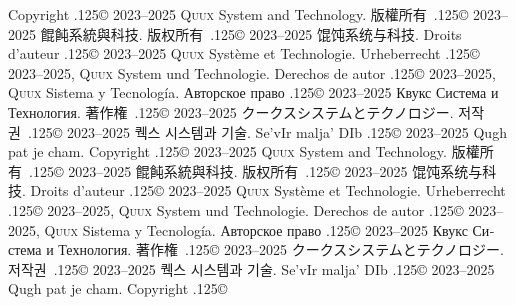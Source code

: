 \documentclass{cookbook}
\begin{document}
\enlargethispage{9.956575mm}%
\footnotesize%
\singlespacing%
\setlength{\parindent}{0pt}%
\setlength{\parskip}{.5\baselineskip}%
\setlength{\parfillskip}{0pt}%

Copyright {\lower.125\baselineskip\hbox{\copyright}}
	2023--2025 \textsc{Quux} System and Technology.
版權所有~{\lower.125\baselineskip\hbox{\copyright}}
	2023--2025 餛飩系統與科技.
版权所有~{\lower.125\baselineskip\hbox{\copyright}}
	2023--2025 馄饨系统与科技.
Droits d'auteur {\lower.125\baselineskip\hbox{\copyright}} %
	2023--2025 \textsc{Quux} Système et Technologie.
Urheberrecht {\lower.125\baselineskip\hbox{\copyright}} %
	2023--2025, \textsc{Quux} System und Technologie.
Derechos de autor {\lower.125\baselineskip\hbox{\copyright}} %
	2023--2025, \textsc{Quux} Sistema y Tecnología.
\foreignlanguage{russian}{Авторское право} %
	{\lower.125\baselineskip\hbox{\copyright}}
	2023–2025 \foreignlanguage{russian}{Квукс Система и Технология.}
著作権~{\lower.125\baselineskip\hbox{\copyright}}
	2023--2025 クークスシステムとテクノロジー.
저작권~{\lower.125\baselineskip\hbox{\copyright}}
	2023--2025 퀙스 시스템과 기술.
Se'vIr malja' DIb {\lower.125\baselineskip\hbox{\copyright}} %
	2023--2025 Qugh pat je cham.
Copyright {\lower.125\baselineskip\hbox{\copyright}}
	2023--2025 \textsc{Quux} System and Technology.
版權所有~{\lower.125\baselineskip\hbox{\copyright}}
	2023--2025 餛飩系統與科技.
版权所有~{\lower.125\baselineskip\hbox{\copyright}}
	2023--2025 馄饨系统与科技.
Droits d'auteur {\lower.125\baselineskip\hbox{\copyright}} %
	2023--2025 \textsc{Quux} Système et Technologie.
Urheberrecht {\lower.125\baselineskip\hbox{\copyright}} %
	2023--2025, \textsc{Quux} System und Technologie.
Derechos de autor {\lower.125\baselineskip\hbox{\copyright}} %
	2023--2025, \textsc{Quux} Sistema y Tecnología.
\foreignlanguage{russian}{Авторское право} %
	{\lower.125\baselineskip\hbox{\copyright}}
	2023–2025 \foreignlanguage{russian}{Квукс Система и Технология.}
著作権~{\lower.125\baselineskip\hbox{\copyright}}
	2023--2025 クークスシステムとテクノロジー.
저작권~{\lower.125\baselineskip\hbox{\copyright}}
	2023--2025 퀙스 시스템과 기술.
Se'vIr malja' DIb {\lower.125\baselineskip\hbox{\copyright}} %
	2023--2025 Qugh pat je cham.
Copyright {\lower.125\baselineskip\hbox{\copyright}}
\end{document}
